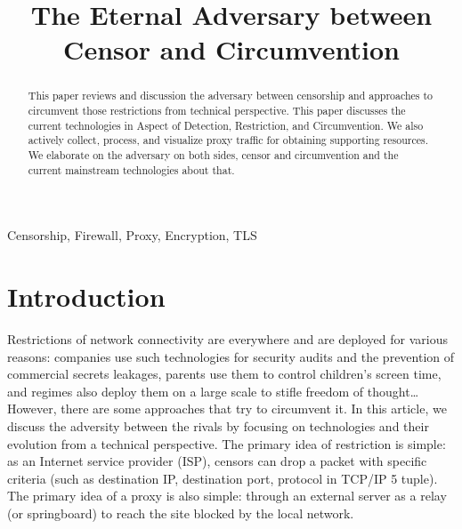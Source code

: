 \documentclass[conference]{IEEEtran}
\begin{document}
\title{The Eternal Adversary between Censor and Circumvention}
\footnotesize

\author{
}
\maketitle

\begin{abstract}
This paper reviews and discussion the adversary between censorship and approaches to circumvent those restrictions from technical perspective. This paper discusses the current technologies in Aspect of Detection, Restriction, and Circumvention. We also actively collect, process, and visualize proxy traffic for obtaining supporting resources. We elaborate on the adversary on both sides, censor and circumvention and the current mainstream technologies about that.
\end{abstract}

\begin{IEEEkeywords}
Censorship, Firewall, Proxy, Encryption, TLS
\end{IEEEkeywords}

\section{Introduction}
Restrictions of network connectivity are everywhere and are deployed for various reasons: companies use such technologies for security audits and the prevention of commercial secrets leakages, parents use them to control children's screen time, and regimes also deploy them on a large scale to stifle freedom of thought… However, there are some approaches that try to circumvent it. In this article, we discuss the adversity between the rivals by focusing on technologies and their evolution from a technical perspective. 
The primary idea of restriction is simple: as an Internet service provider (ISP), censors can drop a packet with specific criteria (such as destination IP, destination port, protocol in TCP/IP 5 tuple). 
The primary idea of a proxy is also simple: through an external server as a relay (or springboard) to reach the site blocked by the local network.
\end{document}
